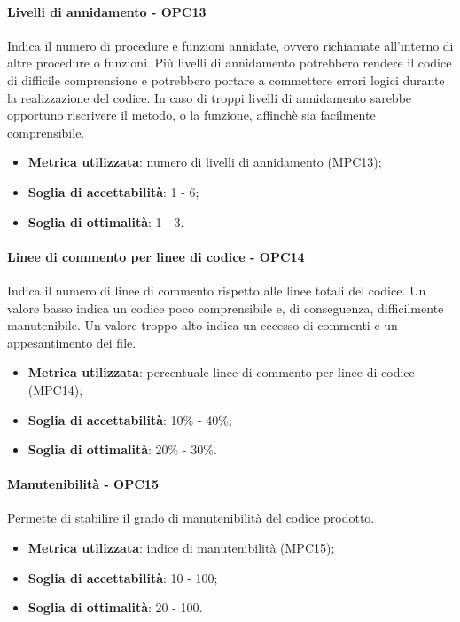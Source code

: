 \documentclass[PdQ.tex]{subfiles}
\begin{document}
			\paragraph{Livelli di annidamento - OPC13}
				Indica il numero di procedure e funzioni annidate, ovvero richiamate all'interno di altre procedure o funzioni. Più livelli di annidamento
				potrebbero rendere il codice di difficile comprensione e potrebbero portare a commettere errori logici durante la realizzazione del codice.
				In caso di troppi livelli di annidamento sarebbe opportuno riscrivere il metodo, o la funzione, affinchè sia facilmente comprensibile.
				\begin{itemize}
					\item \textbf{Metrica utilizzata}: numero di livelli di annidamento (MPC13);
					\item \textbf{Soglia di accettabilità}: 1 - 6;
					\item \textbf{Soglia di ottimalità}: 1 - 3.
				\end{itemize}
			
			\paragraph{Linee di commento per linee di codice - OPC14}
				Indica il numero di linee di commento rispetto alle linee totali del codice. Un valore basso indica un codice poco comprensibile
				e, di conseguenza, difficilmente manutenibile. Un valore troppo alto indica un eccesso di commenti e un appesantimento dei file.
				\begin{itemize}
					\item \textbf{Metrica utilizzata}: percentuale linee di commento per linee di codice (MPC14);
					\item \textbf{Soglia di accettabilità}: 10\% - 40\%;
					\item \textbf{Soglia di ottimalità}: 20\% - 30\%.
				\end{itemize}
			
				
			\paragraph{Manutenibilità - OPC15}
				Permette di stabilire il grado di manutenibilità del codice prodotto.
				\begin{itemize}
					\item \textbf{Metrica utilizzata}: indice di manutenibilità (MPC15);
					\item \textbf{Soglia di accettabilità}: 10 - 100;
					\item \textbf{Soglia di ottimalità}: 20 - 100.
				\end{itemize}
		
\end{document}
